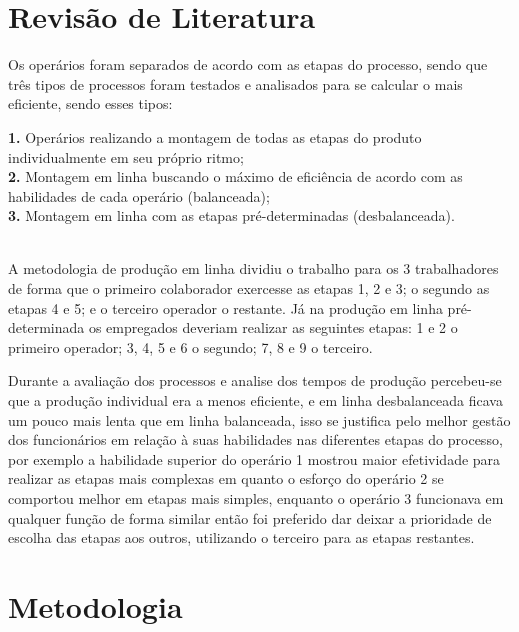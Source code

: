 \documentclass[
	12pt,				%
	oneside,			%
	a4paper,			%
	english,			%
	french,				%
	spanish,			%
	brazil,				%
	]{abntex2}
\begin{document}
\newpage
\section[Revisão de Literatura]{Revisão de Literatura}
\pagestyle{fancy}

Os operários foram separados de acordo com as etapas do processo, sendo que três tipos de processos foram testados e analisados para se calcular o mais eficiente, sendo esses tipos: \\


\begin{minipage}{13cm}
\begin{center}
\textbf{1.} Operários realizando a montagem de todas as etapas do produto individualmente em seu próprio ritmo;\\ 
\textbf{2.} Montagem em linha buscando o máximo de eficiência de acordo com as habilidades de cada operário (balanceada); \\
\textbf{3.} Montagem em linha com as etapas pré-determinadas (desbalanceada).
\end{center}
\end{minipage}\\

A metodologia de produção em linha dividiu o trabalho para os 3 trabalhadores de forma que o primeiro colaborador exercesse as etapas 1, 2 e 3; o segundo as etapas 4 e 5; e o terceiro operador o restante. Já na produção em linha pré-determinada os empregados deveriam realizar as seguintes etapas: 1 e 2 o primeiro operador; 3, 4, 5 e 6 o segundo; 7, 8 e 9 o terceiro.

Durante a avaliação dos processos e analise dos tempos de produção percebeu-se que a produção individual era a menos eficiente, e em linha desbalanceada ficava um pouco mais lenta que em linha balanceada, isso se justifica pelo melhor gestão dos funcionários em relação à suas habilidades nas diferentes etapas do processo, por exemplo a habilidade superior do operário 1 mostrou maior efetividade para realizar as etapas mais complexas em quanto o esforço do operário 2 se comportou melhor em etapas mais simples, enquanto o operário 3 funcionava em qualquer função de forma similar então foi preferido dar deixar a prioridade de escolha das etapas aos outros, utilizando o terceiro para as etapas restantes.

\newpage
\section[Metodologia]{Metodologia}
\pagestyle{fancy}
\end{document}
